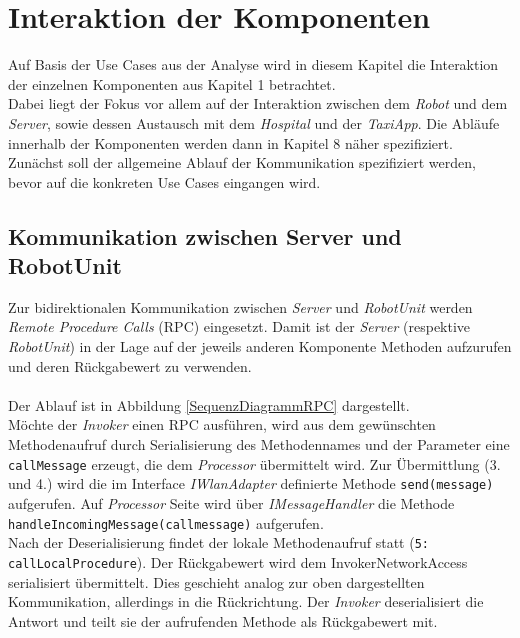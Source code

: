 \section{Interaktion der Komponenten}
Auf Basis der Use Cases aus der Analyse wird in diesem Kapitel die Interaktion der einzelnen Komponenten aus Kapitel 1 betrachtet. \\
Dabei liegt der Fokus vor allem auf der Interaktion zwischen dem \emph{Robot} und dem \emph{Server}, sowie dessen Austausch mit dem \emph{Hospital} und der \emph{TaxiApp}. 
Die Abläufe innerhalb der Komponenten werden dann in Kapitel 8 näher spezifiziert. \\
Zunächst soll der allgemeine Ablauf der Kommunikation spezifiziert werden, bevor auf die konkreten Use Cases eingangen wird.

\subsection*{Kommunikation zwischen Server und RobotUnit}
Zur bidirektionalen Kommunikation zwischen \emph{Server} und \emph{RobotUnit} werden \emph{Remote Procedure Calls} (RPC) eingesetzt. Damit ist der \emph{Server} (respektive \emph{RobotUnit}) in der Lage auf der jeweils anderen Komponente Methoden aufzurufen und deren Rückgabewert zu verwenden. \\ \\
Der Ablauf ist in Abbildung \ref{SequenzDiagrammRPC} dargestellt. \\
Möchte der \emph{Invoker} einen RPC ausführen, wird aus dem gewünschten Methodenaufruf durch Serialisierung des Methodennames und der Parameter eine \texttt{callMessage} erzeugt, die dem \emph{Processor} übermittelt wird. Zur Übermittlung (3. und 4.) wird die im Interface \emph{IWlanAdapter} definierte Methode \texttt{send(message)} aufgerufen. Auf \emph{Processor} Seite wird über \emph{IMessageHandler} die Methode \texttt{handleIncomingMessage(callmessage)} aufgerufen. \\
Nach der Deserialisierung findet der lokale Methodenaufruf statt (\texttt{5: callLocalProcedure}). Der Rückgabewert wird dem InvokerNetworkAccess serialisiert übermittelt. Dies geschieht analog zur oben dargestellten Kommunikation, allerdings in die Rückrichtung. Der \emph{Invoker} deserialisiert die Antwort und teilt sie der aufrufenden Methode als Rückgabewert mit.
